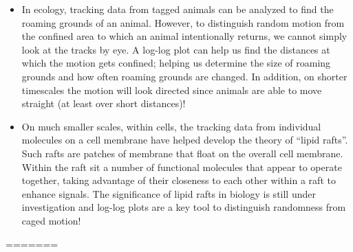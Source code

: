 \begin{itemize}
\item In ecology, tracking data from tagged animals can be analyzed to find the roaming grounds of an animal.
However, to distinguish random motion from the confined area to which an animal intentionally returns, we cannot simply look at the tracks by eye.
A log-log plot can help us find the distances at which the motion gets confined; helping us determine the size of roaming grounds and how often roaming grounds are changed.
In addition, on shorter timescales the motion will look directed since animals are able to move straight (at least over short distances)!
\item On much smaller scales, within cells, the tracking data from individual molecules on a cell membrane have helped develop the theory of ``lipid rafts''. Such rafts are patches of membrane that float on the overall cell membrane. Within the raft sit a number of functional molecules that appear to operate together, taking advantage of their closeness to each other within a raft to enhance signals. The significance of lipid rafts in biology is still under investigation and log-log plots are a key tool to distinguish randomness from caged motion!
\end{itemize}
=======
